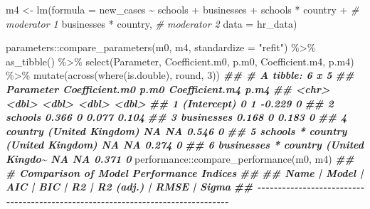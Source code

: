 \documentclass[
]{book}
\newenvironment{Shaded}{\begin{snugshade}}{\end{snugshade}}
\newcommand{\AttributeTok}[1]{\textcolor[rgb]{0.77,0.63,0.00}{#1}}
\newcommand{\CommentTok}[1]{\textcolor[rgb]{0.56,0.35,0.01}{\textit{#1}}}
\newcommand{\DecValTok}[1]{\textcolor[rgb]{0.00,0.00,0.81}{#1}}
\newcommand{\DocumentationTok}[1]{\textcolor[rgb]{0.56,0.35,0.01}{\textbf{\textit{#1}}}}
\newcommand{\FunctionTok}[1]{\textcolor[rgb]{0.00,0.00,0.00}{#1}}
\newcommand{\NormalTok}[1]{#1}
\newcommand{\OtherTok}[1]{\textcolor[rgb]{0.56,0.35,0.01}{#1}}
\newcommand{\SpecialCharTok}[1]{\textcolor[rgb]{0.00,0.00,0.00}{#1}}
\newcommand{\StringTok}[1]{\textcolor[rgb]{0.31,0.60,0.02}{#1}}
\begin{document}
\begin{Shaded}
\begin{Highlighting}[]
\NormalTok{m4 }\OtherTok{\textless{}{-}} \FunctionTok{lm}\NormalTok{(}\AttributeTok{formula =}\NormalTok{ new\_cases }\SpecialCharTok{\textasciitilde{}}
\NormalTok{           schools }\SpecialCharTok{+}
\NormalTok{           businesses }\SpecialCharTok{+}
\NormalTok{           schools }\SpecialCharTok{*}\NormalTok{ country }\SpecialCharTok{+}  \CommentTok{\# moderator 1}
\NormalTok{           businesses }\SpecialCharTok{*}\NormalTok{ country, }\CommentTok{\# moderator 2}
         \AttributeTok{data =}\NormalTok{ hr\_data)}

\NormalTok{parameters}\SpecialCharTok{::}\FunctionTok{compare\_parameters}\NormalTok{(m0, m4, }\AttributeTok{standardize =} \StringTok{"refit"}\NormalTok{) }\SpecialCharTok{\%\textgreater{}\%}
  \FunctionTok{as\_tibble}\NormalTok{() }\SpecialCharTok{\%\textgreater{}\%}
  \FunctionTok{select}\NormalTok{(Parameter, Coefficient.m0, p.m0, Coefficient.m4, p.m4) }\SpecialCharTok{\%\textgreater{}\%} 
  \FunctionTok{mutate}\NormalTok{(}\FunctionTok{across}\NormalTok{(}\FunctionTok{where}\NormalTok{(is.double), round, }\DecValTok{3}\NormalTok{))}
\DocumentationTok{\#\# \# A tibble: 6 x 5}
\DocumentationTok{\#\#   Parameter                            Coefficient.m0  p.m0 Coefficient.m4  p.m4}
\DocumentationTok{\#\#   \textless{}chr\textgreater{}                                         \textless{}dbl\textgreater{} \textless{}dbl\textgreater{}          \textless{}dbl\textgreater{} \textless{}dbl\textgreater{}}
\DocumentationTok{\#\# 1 (Intercept)                                   0         1         {-}0.229 0    }
\DocumentationTok{\#\# 2 schools                                       0.366     0          0.077 0.104}
\DocumentationTok{\#\# 3 businesses                                    0.168     0          0.183 0    }
\DocumentationTok{\#\# 4 country (United Kingdom)                     NA        NA          0.546 0    }
\DocumentationTok{\#\# 5 schools * country (United Kingdom)           NA        NA          0.274 0    }
\DocumentationTok{\#\# 6 businesses * country (United Kingdo\textasciitilde{}         NA        NA          0.371 0}
\NormalTok{performance}\SpecialCharTok{::}\FunctionTok{compare\_performance}\NormalTok{(m0, m4)}
\DocumentationTok{\#\# \# Comparison of Model Performance Indices}
\DocumentationTok{\#\# }
\DocumentationTok{\#\# Name | Model |       AIC |       BIC |    R2 | R2 (adj.) |      RMSE |     Sigma}
\DocumentationTok{\#\# {-}{-}{-}{-}{-}{-}{-}{-}{-}{-}{-}{-}{-}{-}{-}{-}{-}{-}{-}{-}{-}{-}{-}{-}{-}{-}{-}{-}{-}{-}{-}{-}{-}{-}{-}{-}{-}{-}{-}{-}{-}{-}{-}{-}{-}{-}{-}{-}{-}{-}{-}{-}{-}{-}{-}{-}{-}{-}{-}{-}{-}{-}{-}{-}{-}{-}{-}{-}{-}{-}{-}{-}{-}{-}{-}{-}{-}{-}{-}{-}}

\end{Highlighting}
\end{Shaded}
\end{document}
